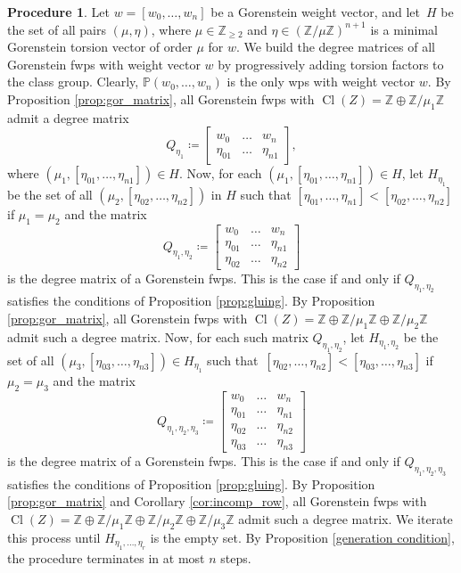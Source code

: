 \documentclass{amsart}
\DeclareMathOperator{\Cl}{Cl}
\newcommand{\Pp}{\mathbb{P}}
\newcommand{\Z}{\mathbb{Z}}
\theoremstyle{definition}
\newtheorem{procedure}[lem]{Procedure}
\begin{document}
\begin{procedure}\label{proc:gluing}
    Let $w=[w_0,\dots,w_n]$ be a Gorenstein weight vector, and let~$H$ be the set of all pairs $(\mu,\eta)$, where $\mu\in\Z_{\geq 2}$ and $\eta\in(\Z/\mu\Z)^{n+1}$ is a minimal Gorenstein torsion vector of order $\mu$ for $w$. We build the degree matrices of all Gorenstein fwps with weight vector $w$ by progressively adding torsion factors to the class group.
    Clearly, $\Pp(w_0,\dots,w_n)$ is the only wps with weight vector $w$. By Proposition \ref{prop:gor_matrix}, all Gorenstein fwps with $\Cl(Z)=\Z\oplus \Z/\mu_1\Z$ admit a degree matrix
    $$
    Q_{\eta_1}\coloneqq\begin{bmatrix}
        w_0 & \dots & w_n\\
        \eta_{01} & \dots & \eta_{n1}
    \end{bmatrix},
    $$
    where $(\mu_1,[\eta_{01},\dots,\eta_{n1}])\in H$.
    Now, for each $(\mu_1,[\eta_{01},\dots,\eta_{n1}])\in H$, let $H_{\eta_1}$ be the set of all $(\mu_2,[\eta_{02},\dots,\eta_{n2}])$ in $H$ such that $[\eta_{01},\dots,\eta_{n1}]<[\eta_{02},\dots,\eta_{n2}]$ if $\mu_1=\mu_2$ and the matrix
    $$
    Q_{\eta_1,\eta_2}\coloneqq\begin{bmatrix}
        w_0 & \dots & w_n\\
        \eta_{01} & \dots & \eta_{n1}\\
        \eta_{02} & \dots & \eta_{n2}
    \end{bmatrix}
    $$
    is the degree matrix of a Gorenstein fwps. This is the case if and only if $Q_{\eta_1,\eta_2}$ satisfies the conditions of Proposition \ref{prop:gluing}. By Proposition \ref{prop:gor_matrix}, all Gorenstein fwps with $\Cl(Z)=\Z\oplus\Z/\mu_1\Z\oplus\Z/\mu_2\Z$ admit such a degree matrix. Now, for each such matrix $Q_{\eta_1,\eta_2}$, let $H_{\eta_1,\eta_2}$ be the set of all $(\mu_3,[\eta_{03},\dots,\eta_{n3}])\in H_{\eta_1}$ such that~$[\eta_{02},\dots,\eta_{n2}]<[\eta_{03},\dots,\eta_{n3}]$ if $\mu_2=\mu_3$ and the matrix
    $$
    Q_{\eta_1,\eta_2,\eta_3}\coloneqq\begin{bmatrix}
        w_0 & \dots & w_n\\
        \eta_{01} & \dots & \eta_{n1}\\
        \eta_{02} & \dots & \eta_{n2}\\
        \eta_{03} & \dots & \eta_{n3}
    \end{bmatrix}
    $$
    is the degree matrix of a Gorenstein fwps. This is the case if and only if $Q_{\eta_1,\eta_2,\eta_3}$ satisfies the conditions of Proposition \ref{prop:gluing}. By Proposition \ref{prop:gor_matrix} and Corollary \ref{cor:incomp_row}, all Gorenstein fwps with $\Cl(Z)=\Z\oplus\Z/\mu_1\Z\oplus\Z/\mu_2\Z\oplus \Z/\mu_3\Z$ admit such a degree matrix. We iterate this process until $H_{\eta_1,\dots,\eta_r}$ is the empty set. By Proposition \ref{generation condition}, the procedure terminates in at most $n$ steps. 
\end{procedure}
\end{document}
